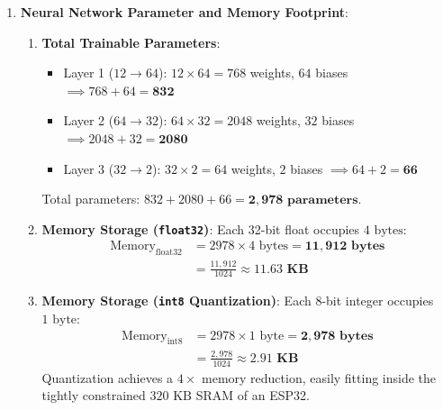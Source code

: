 \begin{enumerate}
    \item \textbf{Neural Network Parameter and Memory Footprint}:
    \begin{enumerate}[label=(\alph*)]
        \item \textbf{Total Trainable Parameters}:
        \begin{itemize}
            \item Layer 1 ($12 \to 64$): $12 \times 64 = 768$ weights, $64$ biases $\implies 768 + 64 = \mathbf{832}$
            \item Layer 2 ($64 \to 32$): $64 \times 32 = 2048$ weights, $32$ biases $\implies 2048 + 32 = \mathbf{2080}$
            \item Layer 3 ($32 \to 2$): $32 \times 2 = 64$ weights, $2$ biases $\implies 64 + 2 = \mathbf{66}$
        \end{itemize}
        Total parameters: $832 + 2080 + 66 = \mathbf{2{,}978\text{ parameters}}$.

        \item \textbf{Memory Storage (\texttt{float32})}:
        Each 32-bit float occupies $4\text{ bytes}$:
        \begin{align*}
        \text{Memory}_{\text{float32}} &= 2978 \times 4\text{ bytes} = \mathbf{11{,}912\text{ bytes}} \\
        &= \frac{11{,}912}{1024} \approx \mathbf{11.63\text{ KB}}
        \end{align*}

        \item \textbf{Memory Storage (\texttt{int8} Quantization)}:
        Each 8-bit integer occupies $1\text{ byte}$:
        \begin{align*}
        \text{Memory}_{\text{int8}} &= 2978 \times 1\text{ byte} = \mathbf{2{,}978\text{ bytes}} \\
        &= \frac{2{,}978}{1024} \approx \mathbf{2.91\text{ KB}}
        \end{align*}
        Quantization achieves a $4\times$ memory reduction, easily fitting inside the tightly constrained $320\text{ KB}$ SRAM of an ESP32.
    \end{enumerate}


\end{enumerate}

